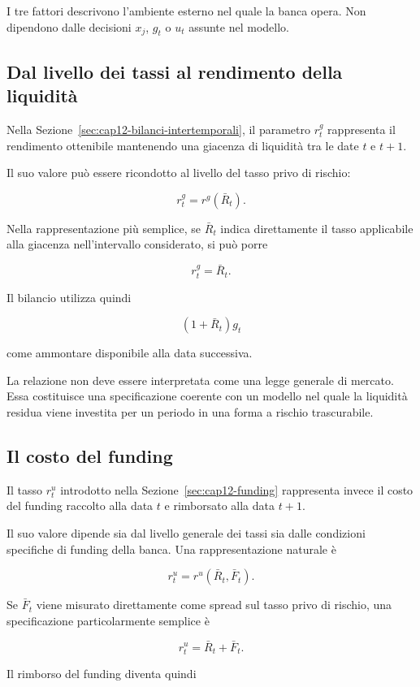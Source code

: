 I tre fattori descrivono l'ambiente esterno nel quale la banca opera. Non
dipendono dalle decisioni $x_j$, $g_t$ o $u_t$ assunte nel modello.

\subsection{Dal livello dei tassi al rendimento della liquidit\`a}

Nella Sezione~\ref{sec:cap12-bilanci-intertemporali}, il parametro $r^g_t$
rappresenta il rendimento ottenibile mantenendo una giacenza di liquidit\`a
tra le date $t$ e $t+1$.

Il suo valore pu\`o essere ricondotto al livello del tasso privo di rischio:

\[
r^g_t
=
r^g(\bar{R}_t).
\]

Nella rappresentazione pi\`u semplice, se $\bar{R}_t$ indica direttamente il
tasso applicabile alla giacenza nell'intervallo considerato, si pu\`o porre

\[
r^g_t=\bar{R}_t.
\]

Il bilancio utilizza quindi

\[
(1+\bar{R}_t)g_t
\]

\noindent come ammontare disponibile alla data successiva.

La relazione non deve essere interpretata come una legge generale di mercato.
Essa costituisce una specificazione coerente con un modello nel quale la
liquidit\`a residua viene investita per un periodo in una forma a rischio
trascurabile.

\subsection{Il costo del funding}

Il tasso $r^u_t$ introdotto nella
Sezione~\ref{sec:cap12-funding} rappresenta invece il costo del funding
raccolto alla data $t$ e rimborsato alla data $t+1$.

Il suo valore dipende sia dal livello generale dei tassi sia dalle condizioni
specifiche di funding della banca. Una rappresentazione naturale \`e

\[
r^u_t
=
r^u(\bar{R}_t,\bar{F}_t).
\]

Se $\bar{F}_t$ viene misurato direttamente come spread sul tasso privo di
rischio, una specificazione particolarmente semplice \`e

\[
r^u_t
=
\bar{R}_t+\bar{F}_t.
\]

Il rimborso del funding diventa quindi


